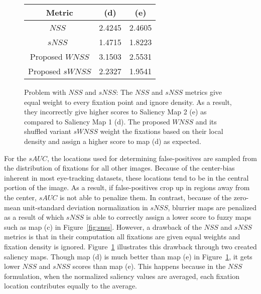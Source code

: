 \documentclass[12pt,onecolumn,journal,	draftclsnofoot]{IEEEtran}
\begin{document}
\begin{figure}[t]
	\centering
	\footnotesize
	\footnotesize
	\begin{tabular}{|c|cc|}
		\hline
		Metric & (d) & (e) \\
		\hline
		$NSS$~\cite{NSS} & 2.4245 & 2.4605 \\ 
		$sNSS$~\cite{MilindSamTPAMI}   & 1.4715 &  1.8223  \\
		Proposed $WNSS$ &  3.1503
		&2.5531 \\
		Proposed $sWNSS$  & 2.2327 & 1.9541 \\
		\hline		
	\end{tabular}
	\caption{Problem with $NSS$ and $sNSS$:  The $NSS$ and $sNSS$ metrics give equal weight to every fixation point and ignore density. As a result, they incorrectly give higher scores to Saliency Map 2 (e) as compared to  Saliency Map 1 (d). The proposed $WNSS$ and its shuffled variant $sWNSS$  weight the fixations based on their local density and assign a higher score to map (d) as expected.}	
	\label{fig:NSSFlaw}	
\end{figure} 
For the $sAUC$, the locations used for determining false-positives are sampled from the distribution of fixations for all other images.  Because of the center-bias inherent in most eye-tracking datasets, these locations tend to be in the central portion of the image. As a result, if false-positives crop up in regions away from the center, $sAUC$ is not able to penalize them. In contrast, because of the zero-mean unit-standard deviation normalization in $sNSS$, blurrier maps are penalized as a result of which $sNSS$ is able to correctly assign a lower score to fuzzy maps such as map (c) in Figure~\ref{fig:snss}. However, a drawback of the  $NSS$ and $sNSS$ metrics is that in their computation all fixations are given equal weights and fixation density is ignored.  Figure~\ref{fig:NSSFlaw} illustrates this drawback through two created saliency maps. Though map (d) is much better than map (e) in Figure~\ref{fig:NSSFlaw}, it gets lower $NSS$ and $sNSS$ scores than map (e).  This happens because in the $NSS$ formulation,  when the normalized saliency values are averaged,  each fixation location contributes equally to the average. 
\end{document}
